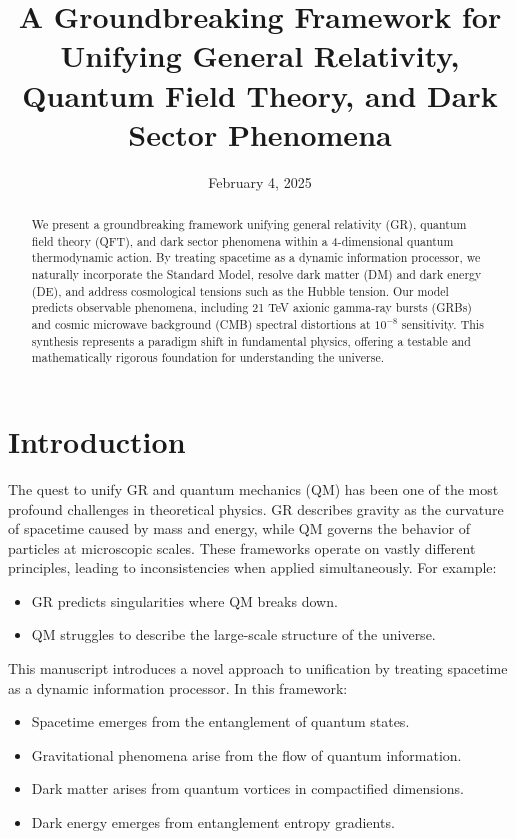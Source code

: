 \documentclass[12pt,a4paper]{article}
\title{A Groundbreaking Framework for Unifying General Relativity, Quantum Field Theory, and Dark Sector Phenomena}
\author{}
\date{February 4, 2025}
\begin{document}
\maketitle

\begin{abstract}
We present a groundbreaking framework unifying general relativity (GR), quantum field theory (QFT), and dark sector phenomena within a 4-dimensional quantum thermodynamic action. By treating spacetime as a dynamic information processor, we naturally incorporate the Standard Model, resolve dark matter (DM) and dark energy (DE), and address cosmological tensions such as the Hubble tension. Our model predicts observable phenomena, including 21 TeV axionic gamma-ray bursts (GRBs) and cosmic microwave background (CMB) spectral distortions at $10^{-8}$ sensitivity. This synthesis represents a paradigm shift in fundamental physics, offering a testable and mathematically rigorous foundation for understanding the universe.
\end{abstract}

\section*{Introduction}
The quest to unify GR and quantum mechanics (QM) has been one of the most profound challenges in theoretical physics. GR describes gravity as the curvature of spacetime caused by mass and energy, while QM governs the behavior of particles at microscopic scales. These frameworks operate on vastly different principles, leading to inconsistencies when applied simultaneously. For example:
\begin{itemize}
    \item GR predicts singularities where QM breaks down.
    \item QM struggles to describe the large-scale structure of the universe.
\end{itemize}
This manuscript introduces a novel approach to unification by treating spacetime as a dynamic information processor. In this framework:
\begin{itemize}
    \item Spacetime emerges from the entanglement of quantum states.
    \item Gravitational phenomena arise from the flow of quantum information.
    \item Dark matter arises from quantum vortices in compactified dimensions.
    \item Dark energy emerges from entanglement entropy gradients.
\end{itemize}
\end{document}
